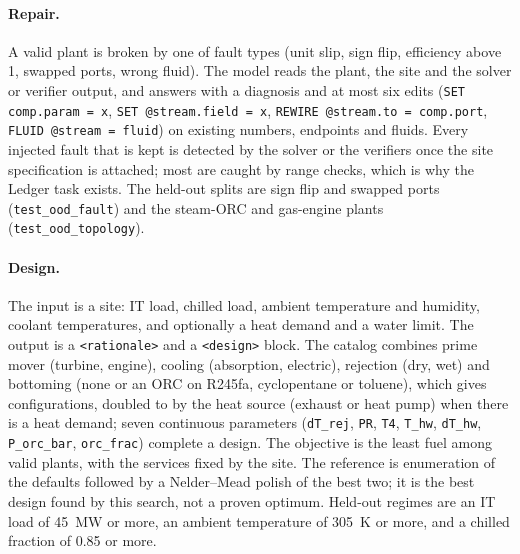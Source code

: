 \begin{table}[tbp]
\centering

\caption{The four tasks: input, output, reward channels with weights (\cref{sec:rewards}) and held-out splits. Split
sizes are in \cref{app:datasets}.}
\label{tab:tasks}
\end{table}

\paragraph{Repair.}
A valid plant is broken by one of  fault types (unit slip, sign flip, efficiency above 1,
swapped ports, wrong fluid). The model reads the plant, the site and the solver or verifier output, and answers with
a diagnosis and at most six edits (\texttt{SET comp.param = x}, \texttt{SET @stream.field = x},
\texttt{REWIRE @stream.to = comp.port}, \texttt{FLUID @stream = fluid}) on existing numbers, endpoints and fluids. Every
injected fault that is kept is detected by the solver or the verifiers once the site specification is attached; most are
caught by range checks, which is why the Ledger task exists. The held-out splits are sign flip and swapped ports
(\texttt{test\_ood\_fault}) and the steam-ORC and gas-engine plants (\texttt{test\_ood\_topology}).

\paragraph{Design.}
The input is a site: IT load, chilled load, ambient temperature and humidity, coolant temperatures, and optionally a heat
demand and a water limit. The output is a \texttt{<rationale>} and a \texttt{<design>} block. The catalog combines prime mover
(turbine, engine), cooling (absorption, electric), rejection (dry, wet) and bottoming (none or an ORC on R245fa, cyclopentane
or toluene), which gives  configurations, doubled to  by the heat source (exhaust or heat pump)
when there is a heat demand; seven continuous parameters (\texttt{dT\_rej}, \texttt{PR}, \texttt{T4}, \texttt{T\_hw}, \texttt{dT\_hw},
\texttt{P\_orc\_bar}, \texttt{orc\_frac}) complete a design. The objective is the least fuel among valid plants, with the services fixed by
the site. The reference is enumeration of the defaults followed by a Nelder--Mead polish of the best two; it is the best design found by this search, not a proven
optimum. Held-out regimes are an IT load of 45~MW or more, an ambient temperature of 305~K or more, and a chilled fraction of 0.85 or more.


